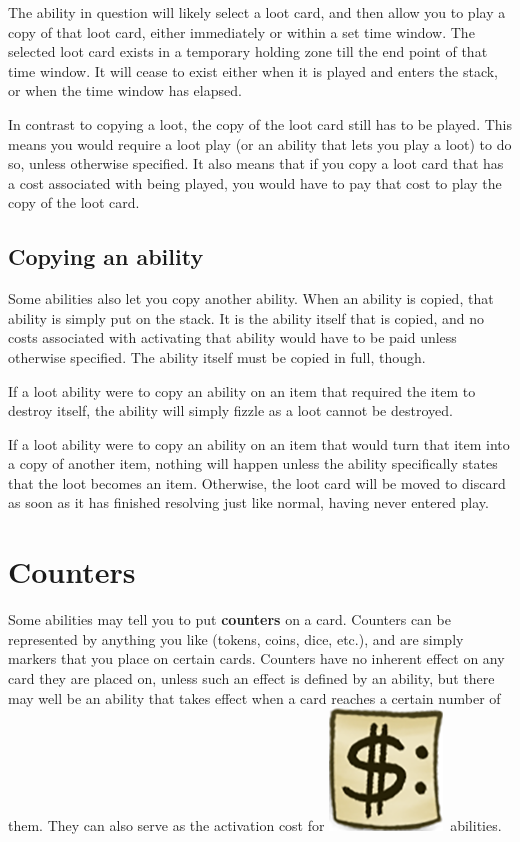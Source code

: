 \documentclass[a4paper, twoside]{report} %
\newcommand{\pay}{\includegraphics[scale=0.1]{./assets/Tag_Paid.png}}
\begin{document}
    The ability in question will likely select a loot card, and then allow you to play a copy of that loot card, either immediately or within a set time window. The selected loot card exists in a temporary holding zone till the end point of that time window. It will cease to exist either when it is played and enters the stack, or when the time window has elapsed.

    In contrast to copying a loot, the copy of the loot card still has to be played. This means you would require a loot play (or an ability that lets you play a loot) to do so, unless otherwise specified. It also means that if you copy a loot card that has a cost associated with being played, you would have to pay that cost to play the copy of the loot card.
    \subsection*{Copying an ability}
    Some abilities also let you copy another ability. When an ability is copied, that ability is simply put on the stack. It is the ability itself that is copied, and no costs associated with activating that ability would have to be paid unless otherwise specified. The ability itself must be copied in full, though.

    If a loot ability were to copy an ability on an item that required the item to destroy itself, the ability will simply fizzle as a loot cannot be destroyed.

    If a loot ability were to copy an ability on an item that would turn that item into a copy of another item, nothing will happen unless the ability specifically states that the loot becomes an item. Otherwise, the loot card will be moved to discard as soon as it has finished resolving just like normal, having never entered play.
    \section{Counters}
    \label{counters}
    Some abilities may tell you to put \textbf{counters} on a card. Counters can be represented by anything you like (tokens, coins, dice, etc.), and are simply markers that you place on certain cards. Counters have no inherent effect on any card they are placed on, unless such an effect is defined by an ability, but there may well be an ability that takes effect when a card reaches a certain number of them. They can also serve as the activation cost for \pay\ abilities.
\end{document}
